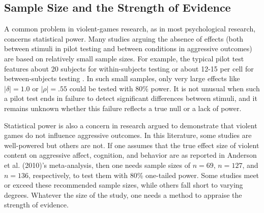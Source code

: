 \documentclass[man]{apa6}
\begin{document}
\subsection{Sample Size and the Strength of Evidence}
A common problem in violent-games research, as in most psychological research, concerns statistical power. Many studies arguing the absence of effects (both between stimuli in pilot testing and between conditions in aggressive outcomes) are based on relatively small sample sizes.   For example, the typical pilot test features about 20 subjects for within-subjects testing \citep[e.g.,][]{Arriaga:etal:2008} or about 12-15 per cell for between-subjects testing \citep[e.g.,][]{Anderson:etal:2004,Valadez:Ferguson:2012}. In such small samples, only very large effects like $|\delta| = 1.0$ or $|\rho| = .55$ could be tested with 80\% power. It is not unusual when such a pilot test ends in failure to detect significant differences between stimuli, and it remains unknown whether this failure reflects a true null or a lack of power.

Statistical power is also a concern in research argued to demonstrate that violent games do not influence aggressive outcomes. In this literature, some studies are well-powered but others are not. If one assumes that the true effect size of violent content on aggressive affect, cognition, and behavior are as reported in Anderson et al. (2010)'s meta-analysis, then one needs sample sizes of $n = 69$, $n = 127$, and $n = 136$, respectively, to test them with 80\% one-tailed power. Some studies meet or exceed these recommended sample sizes, while others fall short to varying degrees. Whatever the size of the study, one needs a method to appraise the strength of evidence.
\end{document}
